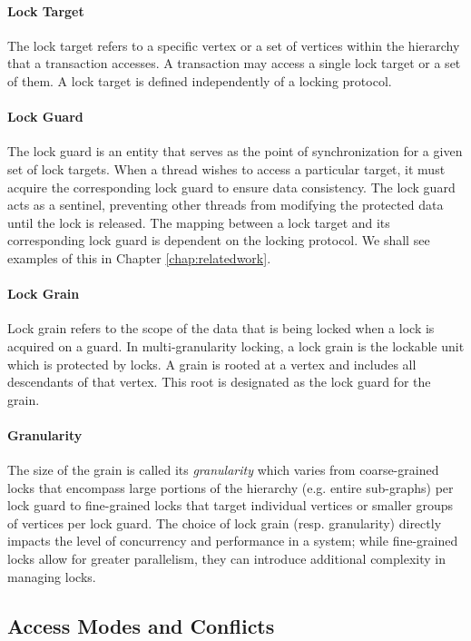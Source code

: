 \paragraph{Lock Target} The lock target refers to a specific vertex or a set of vertices within the hierarchy that a transaction accesses. A transaction may access a single lock target or a set of them. A lock target is defined independently of a locking protocol.  

\paragraph{Lock Guard} The lock guard is an entity that serves as the point of synchronization for a given set of lock targets. When a thread wishes to access a particular target, it must acquire the corresponding lock guard to ensure data consistency. The lock guard acts as a sentinel, preventing other threads from modifying the protected data until the lock is released. The mapping between a lock target and its corresponding lock guard is dependent on the locking protocol. We shall see examples of this in Chapter \ref{chap:relatedwork}.

\paragraph{Lock Grain} Lock grain refers to the scope of the data that is being locked when a lock is acquired on a guard. In multi-granularity locking, a lock grain is the lockable unit which is protected by locks. A grain is rooted at a vertex and includes all descendants of that vertex. This root is designated as the lock guard for the grain.

\paragraph{Granularity} The size of the grain is called its \emph{granularity} which varies from coarse-grained locks that encompass large portions of the hierarchy (e.g. entire sub-graphs) per lock guard to fine-grained locks that target individual vertices or smaller groups of vertices per lock guard. The choice of lock grain (resp. granularity) directly impacts the level of concurrency and performance in a system; while fine-grained locks allow for greater parallelism, they can introduce additional complexity in managing locks.

\subsection{Access Modes and Conflicts}

